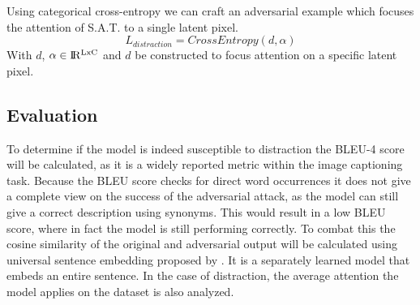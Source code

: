 Using categorical cross-entropy we can craft an adversarial example which focuses the attention of S.A.T. to a single latent pixel.
\begin{equation}
    L_{distraction} = CrossEntropy(d, \alpha)
    \label{distraction_loss}
\end{equation}
With $d$, $\alpha \in \rm I\!R^{LxC}$ and $d$ be constructed to focus attention on a specific latent pixel.

\subsection{Evaluation}
To determine if the model is indeed susceptible to distraction the BLEU-4 score \cite{papineni_roukos_ward_zhu_2001} will be calculated, as it is a widely reported metric within the image captioning task. Because the BLEU score checks for direct word occurrences it does not give a complete view on the success of the adversarial attack, as the model can still give a correct description using synonyms. This would result in a low BLEU score, where in fact the model is still performing correctly. To combat this the cosine similarity of the original and adversarial output will be calculated using universal sentence embedding proposed by \citeauthor{DBLP:journals/corr/abs-1803-11175}. It is a separately learned model that embeds an entire sentence.
In the case of distraction, the average attention the model applies on the dataset is also analyzed.
